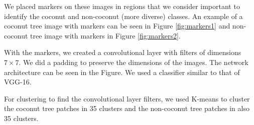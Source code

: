 \documentclass[a4paper,conference]{IEEEtran}
\begin{document}
We placed markers on these images in regions that we consider important to identify the coconut and non-coconut (more diverse) classes. An example of a coconut tree image with markers can be seen in Figure \ref{fig:markers1} and non-coconut tree image with markers in Figure \ref{fig:markers2}.

With the markers, we created a convolutional layer with filters of dimensions $7 \times 7$. We did a padding to preserve the dimensions of the images. The network architecture can be seen in the Figure. We used a classifier similar to that of VGG-16.

For clustering to find the convolutional layer filters, we used K-means to cluster the coconut tree patches in 35 clusters and the non-coconut tree patches in also 35 clusters.

\begin{figure}
  \centering
  ~
  \\
\end{figure}
\end{document}
